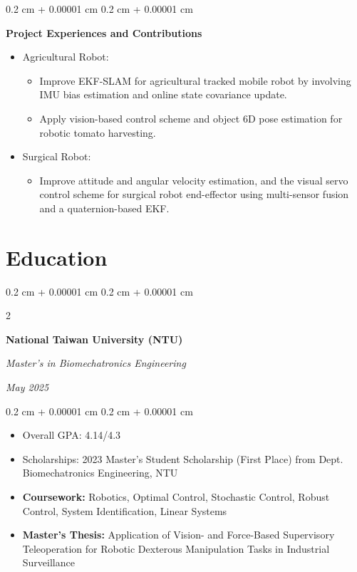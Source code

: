\documentclass[10pt, letterpaper]{article}
\newenvironment{highlights}{
    \begin{itemize}[
        topsep=0.10 cm,
        parsep=0.10 cm,
        partopsep=0pt,
        itemsep=0pt,
        leftmargin=0.4 cm + 10pt
    ]
}{
    \end{itemize}
} %
\newenvironment{onecolentry}{
    \begin{adjustwidth}{
        0.2 cm + 0.00001 cm
    }{
        0.2 cm + 0.00001 cm
    }
}{
    \end{adjustwidth}
} %
\newenvironment{twocolentry}[2][4.5 cm]{
    \needspace{4\baselineskip}%
    \onecolentry
    \def\secondColumn{#2}
    \setcolumnwidth{\fill, #1}
    \begin{paracol}{2}
}{
    \switchcolumn \raggedleft \secondColumn
    \end{paracol}
    \endonecolentry
} %
\begin{document}
        \vspace{0.10 cm}
        \begin{onecolentry}
        \textbf{Project Experiences and Contributions}
            \begin{highlights}
                \item Agricultural Robot:
                \begin{itemize}
                    \item Improve EKF-SLAM for agricultural tracked mobile robot by involving IMU bias estimation and online state covariance update.
                    \item Apply vision-based control scheme and object 6D pose estimation for robotic tomato harvesting.
                \end{itemize}
                \item Surgical Robot:
                \begin{itemize}
                    \item Improve attitude and angular velocity estimation, and the visual servo control scheme for surgical robot end-effector using multi-sensor fusion and a quaternion-based EKF.
                \end{itemize}
            \end{highlights}
        \end{onecolentry}

    \section{Education}
        
        \begin{twocolentry}{
            
            
        \textit{May 2025}}
            \textbf{National Taiwan University (NTU)}

            \textit{Master's in Biomechatronics Engineering}
        \end{twocolentry}

        \vspace{0.10 cm}
        \begin{onecolentry}
            \begin{highlights}
                \item Overall GPA: 4.14/4.3
                \item Scholarships: 2023 Master's Student Scholarship (First Place) from Dept. Biomechatronics Engineering, NTU
                \item \textbf{Coursework:} Robotics, Optimal Control, Stochastic Control, Robust Control, System Identification, Linear Systems
                \item \textbf{Master's Thesis:} Application of Vision- and Force-Based Supervisory Teleoperation for Robotic Dexterous Manipulation Tasks in Industrial Surveillance
            \end{highlights}
        \end{onecolentry}
\end{document}
